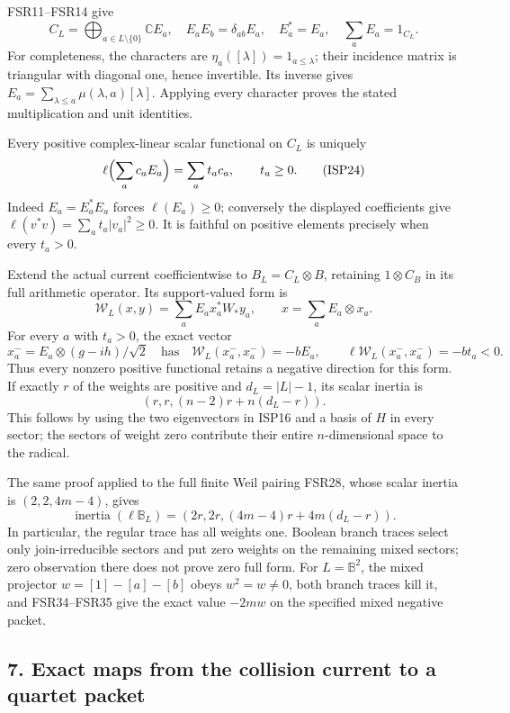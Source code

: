 \documentclass[
  10pt,
  a4paper,
]{article}
\begin{document}
FSR11--FSR14 give \[
C_L=\bigoplus_{a\in L\setminus\{0\}}\mathbb CE_a,
\quad E_aE_b=\delta_{ab}E_a,\quad E_a^*=E_a,
\quad\sum_aE_a=1_{C_L}.
\tag{ISP23}
\] For completeness, the characters are
\(\eta_a([\lambda])=1_{a\le\lambda}\); their incidence matrix is
triangular with diagonal one, hence invertible. Its inverse gives
\(E_a=\sum_{\lambda\le a}\mu(\lambda,a)[\lambda]\). Applying every
character proves the stated multiplication and unit identities.

Every positive complex-linear scalar functional on \(C_L\) is uniquely
\[
\ell\Bigl(\sum_ac_aE_a\Bigr)=\sum_at_ac_a,
\qquad t_a\ge0.
\tag{ISP24}
\] Indeed \(E_a=E_a^*E_a\) forces \(\ell(E_a)\ge0\); conversely the
displayed coefficients give \(\ell(v^*v)=\sum_at_a|v_a|^2\ge0\). It is
faithful on positive elements precisely when every \(t_a>0\).

Extend the actual current coefficientwise to \(B_L=C_L\otimes B\),
retaining \(1\otimes C_B\) in its full arithmetic operator. Its
support-valued form is \[
\mathcal W_L(x,y)=\sum_aE_a x_a^*W_*y_a,
\qquad x=\sum_aE_a\otimes x_a.
\tag{ISP25}
\] For every \(a\) with \(t_a>0\), the exact vector \[
x_a^-=E_a\otimes(g-ih)/\sqrt2
\quad\text{has}\quad
\mathcal W_L(x_a^-,x_a^-)=-bE_a,
\qquad\ell\mathcal W_L(x_a^-,x_a^-)=-bt_a<0.
\tag{ISP26}
\] Thus every nonzero positive functional retains a negative direction
for this form. If exactly \(r\) of the weights are positive and
\(d_L=|L|-1\), its scalar inertia is \[
(r,r,(n-2)r+n(d_L-r)).
\tag{ISP27}
\] This follows by using the two eigenvectors in ISP16 and a basis of
\(H\) in every sector; the sectors of weight zero contribute their
entire \(n\)-dimensional space to the radical.

The same proof applied to the full finite Weil pairing FSR28, whose
scalar inertia is \((2,2,4m-4)\), gives \[
\operatorname{inertia}(\ell\mathbb B_L)
=(2r,2r,(4m-4)r+4m(d_L-r)).
\tag{ISP28}
\] In particular, the regular trace has all weights one. Boolean branch
traces select only join-irreducible sectors and put zero weights on the
remaining mixed sectors; zero observation there does not prove zero full
form. For \(L=\mathbb B^2\), the mixed projector \(w=[1]-[a]-[b]\) obeys
\(w^2=w\ne0\), both branch traces kill it, and FSR34--FSR35 give the
exact value \(-2m w\) on the specified mixed negative packet.

\subsection{7. Exact maps from the collision current to a quartet
packet}\label{exact-maps-from-the-collision-current-to-a-quartet-packet}
\end{document}

